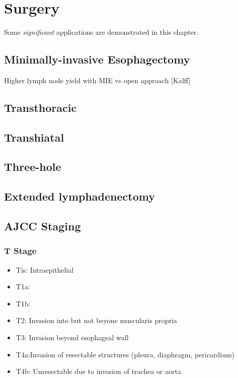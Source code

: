 \documentclass[
]{book}
\providecommand{\tightlist}{%
  \setlength{\itemsep}{0pt}\setlength{\parskip}{0pt}}
\begin{document}
\hypertarget{surgery}{%
\chapter{Surgery}\label{surgery}}

Some \emph{significant} applications are demonstrated in this chapter.

\hypertarget{minimally-invasive-esophagectomy}{%
\section{Minimally-invasive Esophagectomy}\label{minimally-invasive-esophagectomy}}

Higher lymph node yield with MIE vs open approach {[}Kalff{]}

\hypertarget{transthoracic}{%
\section{Transthoracic}\label{transthoracic}}

\hypertarget{transhiatal}{%
\section{Transhiatal}\label{transhiatal}}

\hypertarget{three-hole}{%
\section{Three-hole}\label{three-hole}}

\hypertarget{extended-lymphadenectomy}{%
\section{Extended lymphadenectomy}\label{extended-lymphadenectomy}}

\hypertarget{ajcc-staging}{%
\section{AJCC Staging}\label{ajcc-staging}}

\hypertarget{t-stage}{%
\subsection{T Stage}\label{t-stage}}

\begin{itemize}
\tightlist
\item
  Tis: Intraepithelial
\item
  T1a:
\item
  T1b:
\item
  T2: Invasion into but not beyone muscularis propria
\item
  T3: Invasion beyond esophageal wall
\item
  T4a:Invasion of resectable structures (pleura, diaphragm, pericardium)
\item
  T4b: Unresectable due to invasion of trachea or aorta
\end{itemize}
\end{document}
